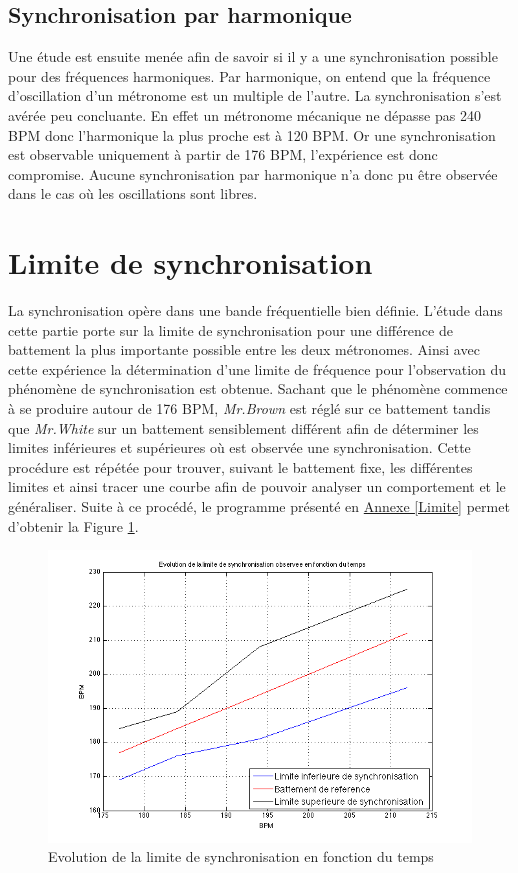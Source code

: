 \documentclass[a4paper,11pt]{report}
\begin{document}
\subsection{Synchronisation par harmonique}
Une étude est ensuite menée afin de savoir si il y a une synchronisation possible pour des fréquences harmoniques. Par harmonique, on entend que la fréquence d'oscillation d'un métronome est un multiple de l'autre. La synchronisation s'est avérée peu concluante. En effet un métronome mécanique ne dépasse pas 240 BPM donc l'harmonique la plus proche est à 120 BPM. Or une synchronisation est observable uniquement à partir de 176 BPM, l'expérience est donc compromise. Aucune synchronisation par harmonique n'a donc pu être observée dans le cas où les oscillations sont libres.

\section{Limite de synchronisation}
La synchronisation opère dans une bande fréquentielle bien définie. L'étude dans cette partie porte sur la limite de synchronisation pour une différence de battement la plus importante possible entre les deux métronomes. Ainsi avec cette expérience la détermination d'une limite de fréquence pour l'observation du phénomène de synchronisation est obtenue. Sachant que le phénomène commence à se produire autour de 176 BPM, {\it Mr.Brown} est réglé sur ce battement tandis que {\it Mr.White} sur un battement sensiblement différent afin de déterminer les limites inférieures et supérieures où est observée une synchronisation. Cette procédure est répétée pour trouver, suivant le battement fixe, les différentes limites et ainsi tracer une courbe afin de pouvoir analyser un comportement et le généraliser. Suite à ce procédé, le programme présenté en \underline{Annexe \ref{Limite}} permet d'obtenir la Figure \ref{LimiteF}.
\begin{figure}[h]
\centering
\includegraphics[width=1\textwidth]{CourbeLimiteSynchro}
\caption{Evolution de la limite de synchronisation en fonction du temps}\label{LimiteF}
\end{figure}\\
\end{document}
